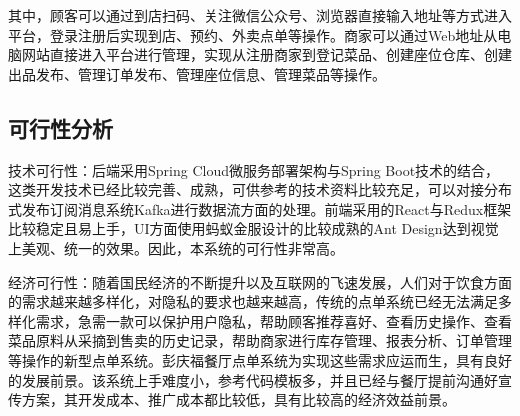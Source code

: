 其中，顾客可以通过到店扫码、关注微信公众号、浏览器直接输入地址等方式进入平台，登录注册后实现到店、预约、外卖点单等操作。商家可以通过Web地址从电脑网站直接进入平台进行管理，实现从注册商家到登记菜品、创建座位仓库、创建出品发布、管理订单发布、管理座位信息、管理菜品等操作。\\

\subsection{可行性分析}
技术可行性：后端采用Spring Cloud微服务部署架构与Spring Boot技术的结合，这类开发技术已经比较完善、成熟，可供参考的技术资料比较充足，可以对接分布式发布订阅消息系统Kafka进行数据流方面的处理。前端采用的React与Redux框架比较稳定且易上手，UI方面使用蚂蚁金服设计的比较成熟的Ant Design达到视觉上美观、统一的效果。因此，本系统的可行性非常高。

经济可行性：随着国民经济的不断提升以及互联网的飞速发展，人们对于饮食方面的需求越来越多样化，对隐私的要求也越来越高，传统的点单系统已经无法满足多样化需求，急需一款可以保护用户隐私，帮助顾客推荐喜好、查看历史操作、查看菜品原料从采摘到售卖的历史记录，帮助商家进行库存管理、报表分析、订单管理等操作的新型点单系统。彭庆福餐厅点单系统为实现这些需求应运而生，具有良好的发展前景。该系统上手难度小，参考代码模板多，并且已经与餐厅提前沟通好宣传方案，其开发成本、推广成本都比较低，具有比较高的经济效益前景。

